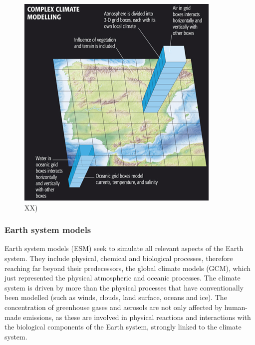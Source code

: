 \documentclass[12pt,oneside]{book}
\begin{document}
\begin{figure}

{\centering \includegraphics[width=0.8\linewidth]{figures/Figure711} 

}

\caption{XX)}\label{fig:GeneralCirculationModels}
\end{figure}

\subsubsection{Earth system models}\label{earth-system-models}

Earth system models (ESM) seek to simulate all relevant aspects of the
Earth system. They include physical, chemical and biological processes,
therefore reaching far beyond their predecessors, the global climate
models (GCM), which just represented the physical atmospheric and
oceanic processes. The climate system is driven by more than the
physical processes that have conventionally been modelled (such as
winds, clouds, land surface, oceans and ice). The concentration of
greenhouse gases and aerosols are not only affected by human-made
emissions, as these are involved in physical reactions and interactions
with the biological components of the Earth system, strongly linked to
the climate system.
\end{document}
